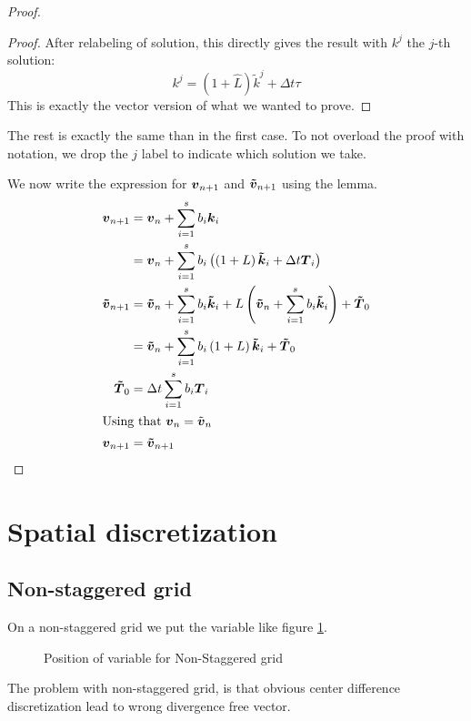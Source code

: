 \begin{proof}
\begin{proof}
After relabeling of solution, this directly gives the result with $k^{j}$ the $j$-th solution:
\begin{equation}
k^{j}=(1+\hat{L})\tilde{k}^{j}+\Delta t \tau
\end{equation}
This is exactly the vector version of what we wanted to prove.
\end{proof}

The rest is exactly the same than in the first case.
To not overload the proof with notation, we drop the $j$ label to indicate which solution we take.

We now write the expression for ${\boldsymbol {v}}_{n+1}$ and ${\boldsymbol {\tilde{v}}}_{n+1}$ using the lemma.
\begin{align*}
{\boldsymbol {v}}_{n+1}&={\boldsymbol {v}}_{n}+\sum_{i=1}^{s}b_{i}{\boldsymbol {k}}_{i}\\
&={\boldsymbol {v}}_{n}+\sum_{i=1}^{s}b_{i}\left(\left(1+L\right){\boldsymbol {\tilde{k}}}_i+\Delta t {\boldsymbol {T}}_{i}\right)\\
{\boldsymbol {\tilde{v}}}_{n+1}&={\boldsymbol {\tilde{v}}}_{n}+\sum_{i=1}^{s}b_{i}{\boldsymbol {\tilde{k}}}_{i}+L\left({\boldsymbol {\tilde{v}}}_{n}+\sum_{i=1}^{s}b_{i}{\boldsymbol {\tilde{k}}}_{i}\right)+{\boldsymbol {\tilde{T}}}_0\\
&={\boldsymbol {\tilde{v}}}_{n}+\sum_{i=1}^{s}b_{i}\left(1+L\right){\boldsymbol {\tilde{k}}}_{i}+{\boldsymbol {\tilde{T}}}_0\\
{\boldsymbol {\tilde{T}}}_0&=\Delta t\sum_{i=1}^{s}b_{i}{\boldsymbol {T}}_{i}\\
\intertext{Using that ${\boldsymbol {v}}_{n}=\tilde{{\boldsymbol {v}}}_{n}$}
{\boldsymbol {v}}_{n+1}&={\boldsymbol {\tilde{v}}}_{n+1}
\end{align*}

\end{proof}

\section{Spatial discretization}

\subsection{Non-staggered grid}

On a non-staggered grid we put the variable like figure \ref{fixed:unstaggered}.
\begin{figure}
\caption{Position of variable for Non-Staggered grid}
\label{fixed:unstaggered}
\end{figure}
The problem with non-staggered  grid, is that obvious center difference discretization lead to wrong divergence free vector.

